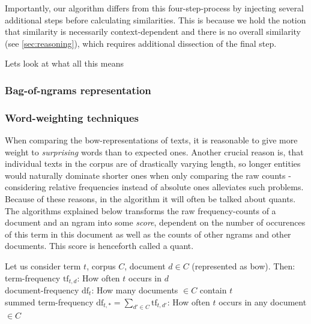 Importantly, our algorithm differs from this four-step-process by injecting several additional steps before calculating similarities. This is because we hold the notion that similarity is necessarily context-dependent and there is no overall similarity (see \autoref{sec:reasoning}), which requires additional dissection of the final step.

Lets look at what all this means

\subsubsection{Bag-of-ngrams representation}
\label{sec:techniques:bow}



\subsubsection{Word-weighting techniques}
\label{sec:word_count_techniques}


When comparing the \gls{bow}-representations of texts, it is reasonable to give more weight to \emph{surprising} words than to expected ones.  \cite[156]{Turney2010} Another crucial reason is, that individual texts in the corpus are of drastically varying length, so longer entities would naturally dominate shorter ones when only comparing the raw counts - considering relative frequencies instead of absolute ones alleviates such problems. Because of these reasons, in the algorithm it will often be talked about \glspl{quant}. The algorithms explained below transforms the raw frequency-counts of a document and an \gls{ngram} into some \emph{score}, dependent on the number of occurences of this term in this document as well as the counts of other \glspl{ngram} and other documents. This score is henceforth called a \gls{quant}.

Let us consider term $t$, corpus $C$, document $d \in C$ (represented as \gls{bow}). Then:\\
term-frequency $\text{tf}_{t,d}$: How often $t$ occurs in $d$\\
document-frequency $\text{df}_t$: How many documents $\in C$ contain $t$\\
summed term-frequency $\text{df}_{t,*} = \sum_{d' \in C} \text{tf}_{t,d'}$: How often $t$ occurs in any document $\in C$

